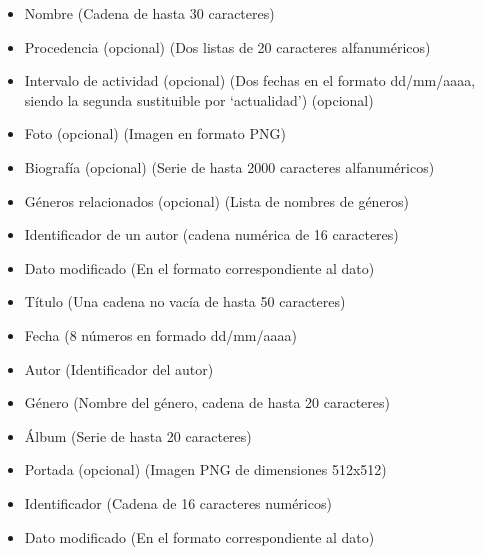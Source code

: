 
\begin{itemize}
  \item Nombre (Cadena de hasta 30 caracteres)
  \item Procedencia (opcional) (Dos listas de 20 caracteres alfanuméricos)
  \item Intervalo de actividad (opcional) (Dos fechas en el formato dd/mm/aaaa, siendo la segunda sustituible por `actualidad') (opcional)
  \item Foto (opcional) (Imagen en formato PNG)
  \item Biografía (opcional) (Serie de hasta 2000 caracteres alfanuméricos)
  \item Géneros relacionados (opcional) (Lista de nombres de géneros)
  \item Identificador de un autor (cadena numérica de 16 caracteres)
\end{itemize}

\begin{itemize}
\item Dato modificado (En el formato correspondiente al dato)
\end{itemize}

\begin{itemize}
  \item Título (Una cadena no vacía de hasta 50 caracteres)
  \item Fecha (8 números en formado dd/mm/aaaa)
  \item Autor (Identificador del autor)
  \item Género (Nombre del género, cadena de hasta 20 caracteres)
  \item Álbum (Serie de hasta 20 caracteres)
  \item Portada (opcional) (Imagen PNG de dimensiones 512x512)
  \item Identificador (Cadena de 16 caracteres numéricos)
\end{itemize}

\begin{itemize}
\item Dato modificado (En el formato correspondiente al dato)
\end{itemize}

